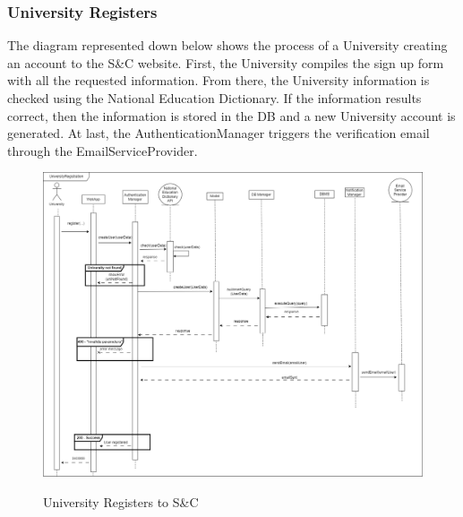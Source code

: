 \documentclass[a4paper,12pt]{article}
\begin{document}
\subsubsection*{University Registers}
The diagram represented down below shows the process of a University creating an account to the S\&C website. First, the University compiles the sign up form with all the requested information. From there, the University information is checked using the National Education Dictionary. If the information results correct, then the information is stored in the DB and a new University account is generated. At last, the AuthenticationManager
triggers the verification email through the EmailServiceProvider.
\begin{figure}[H]
\centering
\includegraphics[scale = 0.30]{DD_figures/RuntimeView/UniversityRegistrationRV.drawio.png}\\
\caption{University Registers to S\&C}
\end{figure}
\newpage
\end{document}
